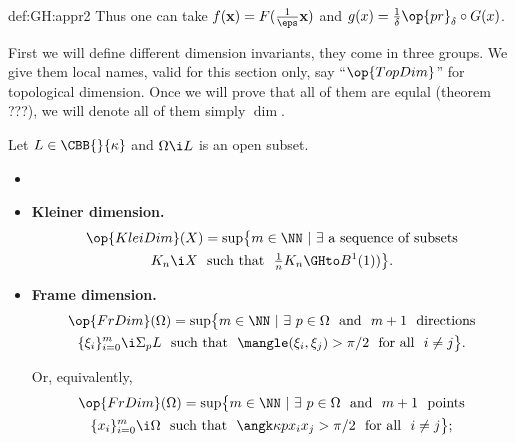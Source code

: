 {\begin{subthm}{def:GH:appr2}
Thus one can take $f(\mathbf x)=F(\tfrac1\eps \mathbf x)$ and $g(x)=\tfrac1\delta\op{pr}_\delta \circ G(x)$.
\qeds

























First we will define different dimension invariants, they come in three groups.
We give them local names, valid for this section only, say ``$\op{TopDim}$'' for topological dimension.
Once we will prove that all of them are equlal (theorem ???), we will denote all of them simply $\dim$.

Let $L\in\CBB{}{\kappa}$ and $\Omega\i L$ is an open subset.
\begin{itemize}

\item\label{E-dim} 
\item\label{E-dim} \textbf{Kleiner dimension.}
\begin{multline*}\op{KleiDim}(X)=\sup\bigl\{m\in\NN\ |\  \exists\ \text{a sequence of subsets}\\ K_n\i X\ \ 
\text{such that}\ \ \tfrac1n K_n\GHto B^1(1))\bigr\}.
\end{multline*}

\item\label{F-dim} \textbf{Frame dimension.}
\begin{multline*}\op{FrDim}(\Omega)=\sup\bigl\{m\in\NN\ |\ \exists\ p\in\Omega\ \ \text{and}\ \ m+1\ \ \text{directions}\\ 
\{\xi_i\}_{i=0}^m\i\Sigma_pL\ \  
\text{such that}\ \ \mangle(\xi_i,\xi_j)>\pi/2\ \ \text{for all}\ \  i\not=j\bigr\}.
\end{multline*}

Or, equivalently,
\begin{multline*}\op{FrDim}(\Omega)=\sup\bigl\{m\in\NN\ |\ \exists\ p\in\Omega\ \ \text{and}\ \ m+1\ \ \text{points}\\ 
\{x_i\}_{i=0}^m\i \Omega\ \  
\text{such that}\ \ \angk\kappa p{x_i}{x_j}>\pi/2\ \ \text{for all}\ \  i\not=j\bigr\};
\end{multline*}


\end{itemize}
\end{subthm}}
